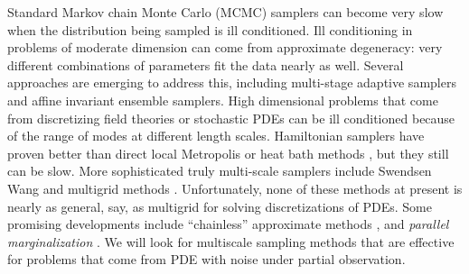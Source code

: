 \documentclass[11pt]{article}
\begin{document}
Standard Markov chain Monte Carlo (MCMC) samplers can become very slow when the distribution being
sampled is ill conditioned.
Ill conditioning in problems of moderate dimension can come from approximate degeneracy: very
different combinations of parameters fit the data nearly as well.
Several approaches are emerging to address this, including multi-stage adaptive samplers and
affine invariant ensemble samplers.
High dimensional problems that come from discretizing field theories or stochastic PDEs
can be ill conditioned because of the range of modes at different length scales.
Hamiltonian samplers have proven better than direct local Metropolis or heat bath methods \cite{Hanson2001}, but
they still can be slow.
More sophisticated truly multi-scale samplers include Swendsen Wang \cite{SwendsonWang1987}
and multigrid methods \cite{Goodman1989}.
Unfortunately, none of these methods at present is nearly as general, say, as multigrid for
solving discretizations of PDEs.
Some promising developments include ``chainless'' approximate methods \cite{Chorin:2008}, and
{\em parallel marginalization} \cite{Weare2007}.
We will look for multiscale sampling methods that are effective for problems that come from PDE
with noise under partial observation.
\end{document}
